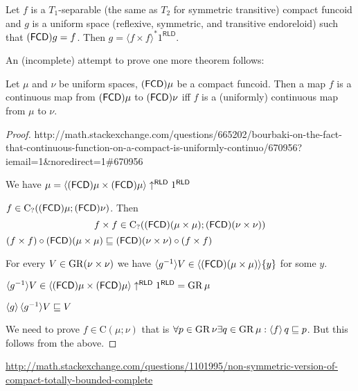 \begin{cor}
  Let $f$ is a $T_1$-separable (the same as $T_2$ for symmetric transitive)
  compact funcoid and $g$ is a uniform space (reflexive, symmetric, and
  transitive endoreloid) such that $(\mathsf{FCD}) g = f$. Then $g =
  \langle f \times f \rangle^{\ast} 1^{\mathsf{RLD}}$.
\end{cor}

An (incomplete) attempt to prove one more theorem follows:

\begin{thm}
  Let $\mu$ and $\nu$ be uniform spaces, $(\mathsf{FCD})
  \mu$ be a compact funcoid. Then a map $f$ is a continuous map from
  $(\mathsf{FCD}) \mu$ to $(\mathsf{FCD}) \nu$ iff $f$ is
  a (uniformly) continuous map from $\mu$ to $\nu$.
\end{thm}

\begin{proof}

http://math.stackexchange.com/questions/665202/bourbaki-on-the-fact-that-continuous-function-on-a-compact-is-uniformly-continuo/670956?iemail=1\&noredirect=1\#670956

We have $\mu= \langle (\mathsf{FCD}) \mu \times
(\mathsf{FCD}) \mu \rangle \uparrow^{\mathsf{RLD}} 1^{\mathsf{RLD}}$

$f \in \mathrm{C}_? ((\mathsf{FCD}) \mu; (\mathsf{FCD})
\nu)$. Then
\[ f \times f \in \mathrm{C}_? ((\mathsf{FCD}) (\mu \times
   \mu) ; (\mathsf{FCD}) (\nu \times \nu)) \]
$(f \times f) \circ (\mathsf{FCD}) (\mu \times \mu)
\sqsubseteq (\mathsf{FCD}) (\nu \times \nu) \circ (f \times f)$

For every $V \in \operatorname{GR} (\nu \times \nu)$ we have $\langle g^{- 1} \rangle
V \in \langle (\mathsf{FCD}) (\mu \times \mu) \rangle
\{ y \}$ for some $y$.

$\langle g^{- 1} \rangle V \in \langle (\mathsf{FCD}) \mu \times
(\mathsf{FCD}) \mu \rangle \uparrow^{\mathsf{RLD}} 1^{\mathsf{RLD}}
= \operatorname{GR} \mu$

$\left\langle g\right\rangle \langle g^{- 1} \rangle V \sqsubseteq V$

We need to prove $f \in \mathrm{C} (\mu; \nu)$ that is $\forall p \in
\operatorname{GR} \nu \exists q \in \operatorname{GR} \mu: \left\langle f\right\rangle q
\sqsubseteq p$. But this follows from the above.
\end{proof}


\url{http://math.stackexchange.com/questions/1101995/non-symmetric-version-of-compact-totally-bounded-complete}